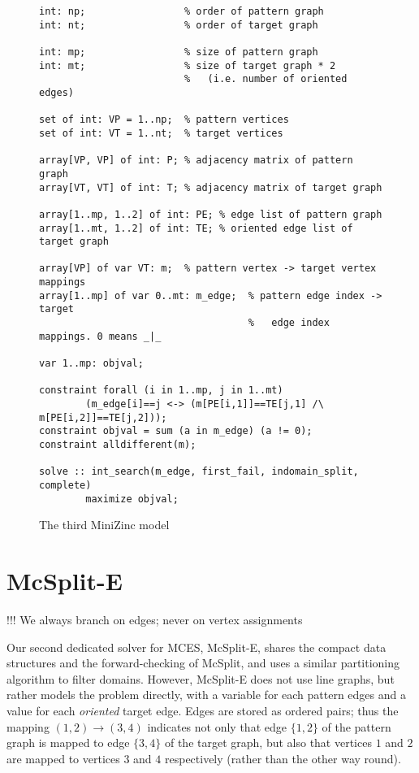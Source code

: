 \begin{figure}
\vspace{.8em}
\footnotesize
\begin{verbatim}
int: np;                 % order of pattern graph
int: nt;                 % order of target graph

int: mp;                 % size of pattern graph
int: mt;                 % size of target graph * 2
                         %   (i.e. number of oriented edges)

set of int: VP = 1..np;  % pattern vertices
set of int: VT = 1..nt;  % target vertices

array[VP, VP] of int: P; % adjacency matrix of pattern graph
array[VT, VT] of int: T; % adjacency matrix of target graph

array[1..mp, 1..2] of int: PE; % edge list of pattern graph
array[1..mt, 1..2] of int: TE; % oriented edge list of target graph

array[VP] of var VT: m;  % pattern vertex -> target vertex mappings
array[1..mp] of var 0..mt: m_edge;  % pattern edge index -> target
                                    %   edge index mappings. 0 means _|_

var 1..mp: objval;

constraint forall (i in 1..mp, j in 1..mt)
        (m_edge[i]==j <-> (m[PE[i,1]]==TE[j,1] /\ m[PE[i,2]]==TE[j,2]));
constraint objval = sum (a in m_edge) (a != 0);
constraint alldifferent(m);

solve :: int_search(m_edge, first_fail, indomain_split, complete)
        maximize objval;
\end{verbatim}
\vspace{-1em}
\caption{The third MiniZinc model}\label{fig:model3}
\end{figure}

\section{McSplit-E}

!!! We always branch on edges; never on vertex assignments

Our second dedicated solver for MCES, McSplit-E, shares the compact data
structures and the forward-checking of McSplit, and uses a similar partitioning
algorithm to filter domains.  However, McSplit-E does not use line graphs, but
rather models the problem directly, with a variable for each pattern edges and a value
for each \textit{oriented} target edge.  Edges are stored as ordered pairs; thus the mapping
$(1,2) \rightarrow (3,4)$ indicates not only that edge $\{1,2\}$ of the pattern graph is
mapped to edge $\{3,4\}$ of the target graph, but also that vertices $1$ and $2$ are mapped
to vertices $3$ and $4$ respectively (rather than the other way round).

